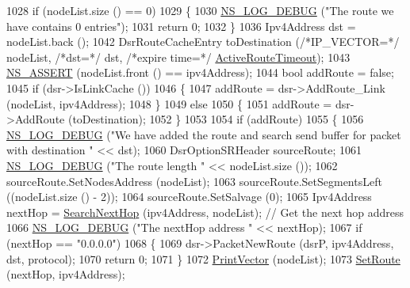 \begin{DoxyCode}
1028       \textcolor{keywordflow}{if} (nodeList.size () == 0)
1029         \{
1030           \hyperlink{group__logging_ga413f1886406d49f59a6a0a89b77b4d0a}{NS\_LOG\_DEBUG} (\textcolor{stringliteral}{"The route we have contains 0 entries"});
1031           \textcolor{keywordflow}{return} 0;
1032         \}
1036       Ipv4Address dst = nodeList.back ();
1042       DsrRouteCacheEntry toDestination (\textcolor{comment}{/*IP\_VECTOR=*/} nodeList, \textcolor{comment}{/*dst=*/} dst, \textcolor{comment}{/*expire time=*/} 
      \hyperlink{classns3_1_1dsr_1_1DsrOptions_a2d111e83b3c91f18ea49478a35ebb119}{ActiveRouteTimeout});
1043       \hyperlink{assert_8h_a6dccdb0de9b252f60088ce281c49d052}{NS\_ASSERT} (nodeList.front () == ipv4Address);
1044       \textcolor{keywordtype}{bool} addRoute = \textcolor{keyword}{false};
1045       \textcolor{keywordflow}{if} (dsr->IsLinkCache ())
1046         \{
1047           addRoute = dsr->AddRoute\_Link (nodeList, ipv4Address);
1048         \}
1049       \textcolor{keywordflow}{else}
1050         \{
1051           addRoute = dsr->AddRoute (toDestination);
1052         \}
1053 
1054       \textcolor{keywordflow}{if} (addRoute)
1055         \{
1056           \hyperlink{group__logging_ga413f1886406d49f59a6a0a89b77b4d0a}{NS\_LOG\_DEBUG} (\textcolor{stringliteral}{"We have added the route and search send buffer for packet with
       destination "} << dst);
1060           DsrOptionSRHeader sourceRoute;
1061           \hyperlink{group__logging_ga413f1886406d49f59a6a0a89b77b4d0a}{NS\_LOG\_DEBUG} (\textcolor{stringliteral}{"The route length "} << nodeList.size ());
1062           sourceRoute.SetNodesAddress (nodeList);
1063           sourceRoute.SetSegmentsLeft ((nodeList.size () - 2));
1064           sourceRoute.SetSalvage (0);
1065           Ipv4Address nextHop = \hyperlink{classns3_1_1dsr_1_1DsrOptions_a061c66ba810a71ae227371a45cc30cc0}{SearchNextHop} (ipv4Address, nodeList); \textcolor{comment}{// Get the next hop
       address}
1066           \hyperlink{group__logging_ga413f1886406d49f59a6a0a89b77b4d0a}{NS\_LOG\_DEBUG} (\textcolor{stringliteral}{"The nextHop address "} << nextHop);
1067           \textcolor{keywordflow}{if} (nextHop == \textcolor{stringliteral}{"0.0.0.0"})
1068             \{
1069               dsr->PacketNewRoute (dsrP, ipv4Address, dst, protocol);
1070               \textcolor{keywordflow}{return} 0;
1071             \}
1072           \hyperlink{classns3_1_1dsr_1_1DsrOptions_a44ae8e58769880ec9c0150bb28652350}{PrintVector} (nodeList);
1073           \hyperlink{classns3_1_1dsr_1_1DsrOptions_af749b76db4626ae64bc37001a5353b99}{SetRoute} (nextHop, ipv4Address);

\end{DoxyCode}
